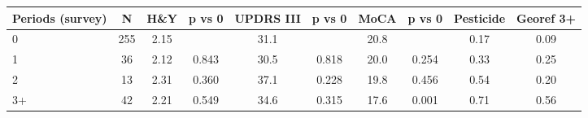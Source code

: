 \begin{tabular}{lccccccccc}
\hline\hline
Periods (survey) & N & H\&Y & p vs 0 & UPDRS III & p vs 0 & MoCA & p vs 0 & Pesticide & Georef 3+ \\
\hline
0 & 255 & 2.15 &  & 31.1 &  & 20.8 &  & 0.17 & 0.09 \\
1 & 36 & 2.12 & 0.843 & 30.5 & 0.818 & 20.0 & 0.254 & 0.33 & 0.25 \\
2 & 13 & 2.31 & 0.360 & 37.1 & 0.228 & 19.8 & 0.456 & 0.54 & 0.20 \\
3+ & 42 & 2.21 & 0.549 & 34.6 & 0.315 & 17.6 & 0.001 & 0.71 & 0.56 \\
\hline\hline
\end{tabular}
